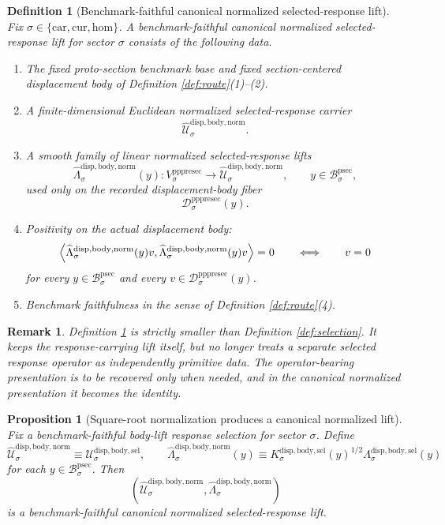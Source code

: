 \documentclass[11pt]{article}
\newcommand{\Car}{\mathrm{car}}
\newcommand{\Cur}{\mathrm{cur}}
\newcommand{\Hom}{\mathrm{hom}}
\newcommand{\ProtoSectionBody}[1]{\mathcal B_{#1}^{\mathrm{psec}}}
\newcommand{\PrePreProtoSectionVertical}[1]{V_{#1}^{\mathrm{pppresec}}}
\newcommand{\PrePreProtoSectionResidualBody}[1]{\mathcal D_{#1}^{\mathrm{pppresec}}}
\newcommand{\LiftSelectionCarrier}[1]{\mathcal U_{#1}^{\mathrm{disp,body,sel}}}
\newcommand{\SelectedResponseLift}[1]{\Lambda_{#1}^{\mathrm{disp,body,sel}}}
\newcommand{\SelectedResponseOperator}[1]{K_{#1}^{\mathrm{disp,body,sel}}}
\newcommand{\NormalizedLiftCarrier}[1]{\widehat{\mathcal U}_{#1}^{\mathrm{disp,body,norm}}}
\newcommand{\NormalizedSelectedResponseLift}[1]{\widehat{\Lambda}_{#1}^{\mathrm{disp,body,norm}}}
\newtheorem{definition}{Definition}
\newtheorem{proposition}{Proposition}
\newtheorem{remark}{Remark}
\begin{document}
\begin{definition}[Benchmark-faithful canonical normalized selected-response lift]
\label{def:normalized}
Fix \(\sigma\in\{\Car,\Cur,\Hom\}\). A \emph{benchmark-faithful canonical normalized selected-response lift} for sector \(\sigma\) consists of the following data.
\begin{enumerate}
    \item The fixed proto-section benchmark base and fixed section-centered displacement body of Definition \ref{def:route}(1)--(2).
    \item A finite-dimensional Euclidean normalized selected-response carrier
    \[
    \NormalizedLiftCarrier{\sigma}.
    \]
    \item A smooth family of linear normalized selected-response lifts
    \[
    \NormalizedSelectedResponseLift{\sigma}(y):
    \PrePreProtoSectionVertical{\sigma}\to\NormalizedLiftCarrier{\sigma},
    \qquad
    y\in\ProtoSectionBody{\sigma},
    \]
    used only on the recorded displacement-body fiber
    \[
    \PrePreProtoSectionResidualBody{\sigma}(y).
    \]
    \item Positivity on the actual displacement body:
    \[
    \ev{
    \NormalizedSelectedResponseLift{\sigma}(y)v,
    \NormalizedSelectedResponseLift{\sigma}(y)v
    }
    =0
    \qquad\Longleftrightarrow\qquad
    v=0
    \]
    for every \(y\in\ProtoSectionBody{\sigma}\) and every \(v\in\PrePreProtoSectionResidualBody{\sigma}(y)\).
    \item Benchmark faithfulness in the sense of Definition \ref{def:route}(4).
\end{enumerate}
\end{definition}

\begin{remark}
Definition \ref{def:normalized} is strictly smaller than Definition \ref{def:selection}. It keeps the response-carrying lift itself, but no longer treats a separate selected response operator as independently primitive data. The operator-bearing presentation is to be recovered only when needed, and in the canonical normalized presentation it becomes the identity.
\end{remark}

\begin{proposition}[Square-root normalization produces a canonical normalized lift]
\label{prop:normalize}
Fix a benchmark-faithful body-lift response selection for sector \(\sigma\). Define
\begin{equation}
\NormalizedLiftCarrier{\sigma}
\equiv
\LiftSelectionCarrier{\sigma},
\qquad
\NormalizedSelectedResponseLift{\sigma}(y)
\equiv
\SelectedResponseOperator{\sigma}(y)^{1/2}\SelectedResponseLift{\sigma}(y)
\label{eq:normalize}
\end{equation}
for each \(y\in\ProtoSectionBody{\sigma}\). Then
\[
\left(
\NormalizedLiftCarrier{\sigma},
\NormalizedSelectedResponseLift{\sigma}
\right)
\]
is a benchmark-faithful canonical normalized selected-response lift.
\end{proposition}
\end{document}
